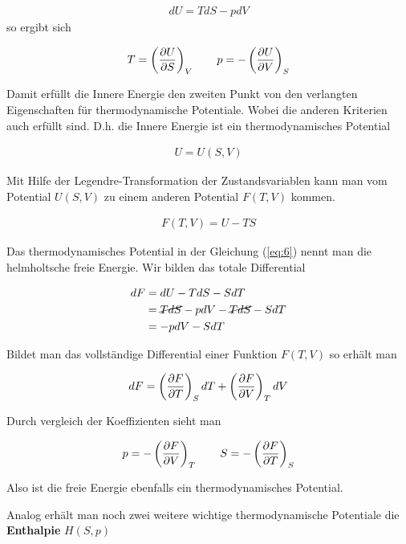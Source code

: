 \begin{align}
  \label{eq:3}
  dU = TdS - pdV
\end{align}
so ergibt sich

\begin{align}
  \label{eq:4}
  T = \left(\pdiff U_S \right)_V \qquad p = - \left(\pdiff U_V \right)_S
\end{align}

Damit erfüllt die Innere Energie den zweiten Punkt von den verlangten Eigenschaften für thermodynamische Potentiale. Wobei die anderen Kriterien auch erfüllt sind. D.h. die Innere Energie ist ein thermodynamisches Potential

\begin{align}
  \label{eq:5}
  U=U(S,V)
\end{align}

Mit Hilfe der Legendre-Transformation der Zustandsvariablen kann man vom Potential \(U(S,V)\) zu einem anderen Potential \(F(T,V)\) kommen.

\begin{align}
  \label{eq:6}
 F(T,V) = U - TS
\end{align}

Das thermodynamisches Potential in der Gleichung (\ref{eq:6}) nennt man die helmholtsche freie Energie. Wir bilden das totale Differential

\begin{align}
  \label{eq:8}
  dF &= dU - TdS - SdT \notag\\
&=  \cancel{TdS} - pdV - \cancel{TdS} - SdT \notag\\
&=-pdV - SdT
\end{align}

Bildet man das vollständige Differential einer Funktion \(F(T,V)\) so erhält man

\begin{align}
  \label{eq:7}
  dF = \left(\pdiff F_T \right)_S dT +  \left(\pdiff F_V \right)_T dV
\end{align}

Durch vergleich der Koeffizienten sieht man

\begin{align}
  \label{eq:9}
  p = - \left(\pdiff F_V \right)_T  \qquad S = - \left(\pdiff F_T \right)_S 
\end{align}

Also ist die freie Energie ebenfalls ein thermodynamisches Potential.


Analog erhält man noch zwei weitere wichtige thermodynamische Potentiale die \textbf{Enthalpie} \(H(S,p)\) 

